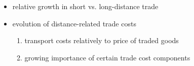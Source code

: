 \documentclass{beamer}
\begin{document}
\begin{frame}[plain]
\begin{itemize}
\begin{itemize}
\item relative growth in short vs. long-distance trade 
\item evolution of distance-related trade costs
\begin{enumerate}
\item transport costs relatively to price of traded goods
\item growing importance of certain trade cost components 
\end{enumerate}
\vspace{0.3cm}
\end{itemize}
\end{itemize}
\end{frame}
\end{document}
